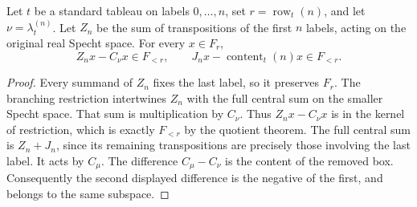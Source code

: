 \begin{lemma}
\label{lem:last-murphy-branching}
\leanok
Let $t$ be a standard tableau on labels $0,\ldots,n$, set
$r=\operatorname{row}_t(n)$, and let $\nu=\lambda_t^{(n)}$.
Let $Z_n$ be the sum of transpositions of the first $n$ labels,
acting on the original real Specht space. For every $x\in F_r$,
\[
 Z_nx-C_\nu x\in F_{<r},\qquad
 J_nx-\operatorname{content}_t(n)x\in F_{<r}.
\]
\end{lemma}
\begin{proof}
Every summand of $Z_n$ fixes the last label, so it preserves $F_r$.
The branching restriction intertwines $Z_n$ with the full central
sum on the smaller Specht space. That sum is multiplication by
$C_\nu$. Thus $Z_nx-C_\nu x$ is in the kernel of restriction,
which is exactly $F_{<r}$ by the quotient theorem.
The full central sum is $Z_n+J_n$, since its remaining transpositions
are precisely those involving the last label. It acts by $C_\mu$.
The difference $C_\mu-C_\nu$ is the content of the removed box.
Consequently the second displayed difference is the negative of the
first, and belongs to the same subspace.
\end{proof}

